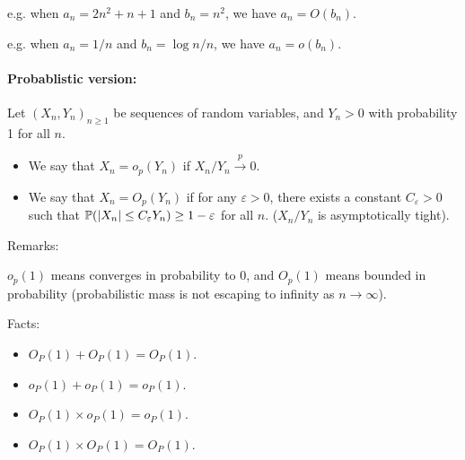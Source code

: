\documentclass[11pt,letterpaper]{article}
\numberwithin{theorem}{lecture}
\numberwithin{proposition}{lecture}
\numberwithin{lemma}{lecture}
\numberwithin{claim}{lecture}
\numberwithin{corollary}{lecture}
\numberwithin{definition}{lecture}
\numberwithin{conjecture}{lecture}
\numberwithin{remark}{lecture}
\numberwithin{example}{lecture}
\numberwithin{equation}{lecture}
\begin{document}
\noindent e.g. when $a_n = 2 n^2 + n +1 $ and $b_n = n^2$, we have $a_n = O (b_n)$.

\noindent e.g. when $a_n = 1/n$ and $b_n = \log n / n$, we have $a_n = o(b_n)$.

\paragraph{Probablistic version:} Let $(X_n, Y_n)_{n \geq 1}$ be sequences of random variables, and $Y_n > 0$ with probability 1 for all $n$.
\begin{itemize}
  \item We say that $X_n = o_p(Y_n)$ if $X_n / Y_n \xrightarrow{p} 0$.
  \item We say that $X_n = O_p (Y_n)$ if for any $\varepsilon > 0$, there exists a constant $C_\varepsilon > 0$ such that ${\mathbb{P}}(|X_n| \leq C_\varepsilon Y_n) \geq 1 - \varepsilon$ for all $n$. ($X_n/ Y_n$ is asymptotically tight).
\end{itemize}
Remarks:

$o_p (1)$ means converges in probability to 0, and $O_p (1)$ means bounded in probability (probabilistic mass is not escaping to infinity as $n \to \infty$).

Facts:
\begin{itemize}
  \item $O_P(1) + O_P(1) = O_P(1)$.
  \item $o_P(1) + o_P(1) = o_P(1)$.
  \item $O_P(1) \times o_P (1) = o_P(1)$.
  \item $O_P(1) \times O_P(1) = O_P (1)$.
\end{itemize}
\end{document}
